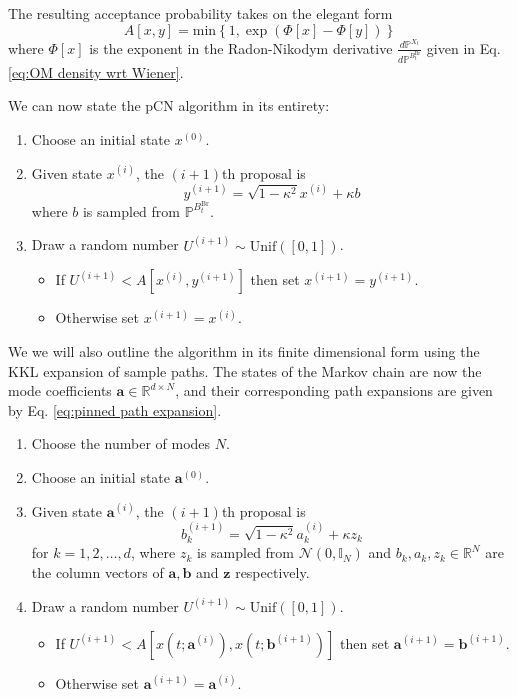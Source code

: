 The resulting acceptance probability takes on the elegant form
\begin{equation}
A[x,y] = \text{min} \left\{ 1, 
\exp \left( \Phi[x] - \Phi[y] \right)
\right\}
\end{equation}
where $\Phi[x]$ is the exponent in the Radon-Nikodym derivative $\frac{d\mathbb{P}^{X_t}}{d \mathbb{P}^{B^\text{Br}_t}}$ given in Eq. \ref{eq:OM density wrt Wiener}.

We can now state the pCN algorithm in its entirety:

\begin{enumerate}
\item Choose an initial state $x^{(0)}$.
\item Given state $x^{(i)}$, the $(i+1)$th proposal is
	\begin{equation}
	y^{(i+1)} = \sqrt{1 - \kappa^2} x^{(i)} + \kappa b
	\end{equation}
	where $b$ is sampled from $\mathbb{P}^{B^\text{Br}_t}$.
\item Draw a random number $U^{(i+1)} \sim \text{Unif}([0,1])$.
	\begin{itemize}
		\item If $U^{(i+1)} < A[x^{(i)}, y^{(i+1)}]$ then set $x^{(i+1)} = y^{(i+1)}$.
		\item Otherwise set $x^{(i+1)} = x^{(i)}$.
	\end{itemize}
\end{enumerate}

We we will also outline the algorithm in its finite dimensional form using the KKL expansion of sample paths. The states of the Markov chain are now the mode coefficients $\mathbf{a} \in \mathbb{R}^{d \times N}$, and their corresponding path expansions are given by Eq. \ref{eq:pinned path expansion}.

\begin{enumerate}
\item Choose the number of modes $N$.
\item Choose an initial state $\mathbf{a}^{(0)}$.
\item Given state $\mathbf{a}^{(i)}$, the $(i+1)$th proposal is
	\begin{equation}
	b_k^{(i+1)} = \sqrt{1 - \kappa^2} a_k^{(i)} + \kappa z_k
	\end{equation}
	for $k=1,2, \dots, d$, where $z_k$ is sampled from $\mathcal{N}(0, \mathbb{I}_{N})$ and $b_k, a_k, z_k \in \mathbb{R}^N$ are the column vectors of $\mathbf{a}, \mathbf{b}$ and $\mathbf{z}$ respectively.
\item Draw a random number $U^{(i+1)} \sim \text{Unif}([0,1])$.
	\begin{itemize}
		\item If $U^{(i+1)} < A[x(t;\mathbf{a}^{(i)}), x(t;\mathbf{b}^{(i+1)})]$ then set $\mathbf{a}^{(i+1)} = \mathbf{b}^{(i+1)}$.
		\item Otherwise set  $\mathbf{a}^{(i+1)} = \mathbf{a}^{(i)}$.
	\end{itemize}
\end{enumerate}

